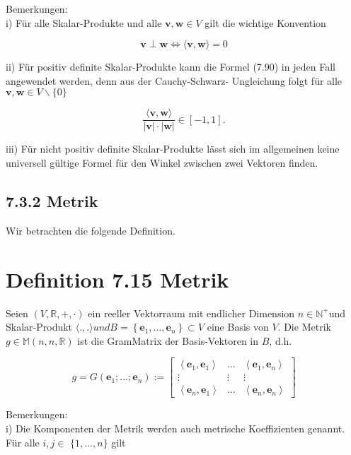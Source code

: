 \documentclass[10pt]{article}
\begin{document}
Bemerkungen:\\
i) Für alle Skalar-Produkte und alle $\mathbf{v}, \mathbf{w} \in V$ gilt die wichtige Konvention


\begin{equation*}
\mathbf{v} \perp \mathbf{w} \Leftrightarrow\langle\mathbf{v}, \mathbf{w}\rangle=0 \tag{7.91}
\end{equation*}


ii) Für positiv definite Skalar-Produkte kann die Formel (7.90) in jeden Fall angewendet werden, denn aus der Cauchy-Schwarz- Ungleichung folgt für alle $\mathbf{v}, \mathbf{w} \in V \backslash\{0\}$


\begin{equation*}
\frac{\langle\mathbf{v}, \mathbf{w}\rangle}{|\mathbf{v}| \cdot|\mathbf{w}|} \in[-1,1] . \tag{7.92}
\end{equation*}


iii) Für nicht positiv definite Skalar-Produkte lässt sich im allgemeinen keine universell gültige Formel für den Winkel zwischen zwei Vektoren finden.

\subsection*{7.3.2 Metrik}
Wir betrachten die folgende Definition.

\section*{Definition 7.15 Metrik}
Seien $(V, \mathbb{R},+, \cdot)$ ein reeller Vektorraum mit endlicher Dimension $n \in \mathbb{N}^{+}$und Skalar-Produkt $\langle.,$.$\rangle und B=\left\{\mathbf{e}_{1}, \ldots, \mathbf{e}_{n}\right\} \subset V$ eine Basis von $V$. Die Metrik $g \in \mathbb{M}(n, n, \mathbb{R})$ ist die GramMatrix der Basis-Vektoren in $B$, d.h.

\[
g=G\left(\mathbf{e}_{1} ; \ldots ; \mathbf{e}_{n}\right):=\left[\begin{array}{ccc}
\left\langle\mathbf{e}_{1}, \mathbf{e}_{1}\right\rangle & \ldots & \left\langle\mathbf{e}_{1}, \mathbf{e}_{n}\right\rangle  \tag{7.93}\\
\vdots & \vdots & \vdots \\
\left\langle\mathbf{e}_{n}, \mathbf{e}_{1}\right\rangle & \ldots & \left\langle\mathbf{e}_{n}, \mathbf{e}_{n}\right\rangle
\end{array}\right]
\]

Bemerkungen:\\
i) Die Komponenten der Metrik werden auch metrische Koeffizienten genannt. Für alle $i, j \in$ $\{1, \ldots, n\}$ gilt
\end{document}

